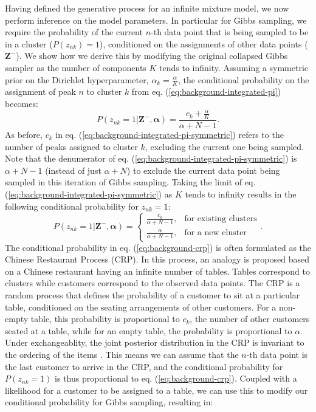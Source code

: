 Having defined the generative process for an infinite mixture model, we now perform inference on the model parameters. In particular for Gibbs sampling, we require the probability of the current $n$-th data point that is being sampled to be in a cluster ($P(z_{nk})=1$), conditioned on the assignments of other data points ($\boldsymbol{Z}^{-}$). We show how we derive this by modifying the original collapsed Gibbs sampler as the number of components $K$ tends to infinity. Assuming a symmetric prior on the Dirichlet hyperparameter, $\alpha_k=\frac{\alpha}{K}$, the conditional probability on the assignment of peak $n$ to cluster $k$ from eq. (\ref{eq:background-integrated-pi}) becomes:
\begin{equation}
P(z_{nk}=1 \vert \boldsymbol{Z}^{-}, \boldsymbol{\alpha}) = \frac{c_k + \frac{\alpha}{K}}{\alpha+N-1}.
\label{eq:background-integrated-pi-symmetric}
\end{equation}
As before, $c_k$ in eq. (\ref{eq:background-integrated-pi-symmetric}) refers to the number of peaks assigned to cluster $k$, excluding the current one being sampled. Note that the denumerator of eq. (\ref{eq:background-integrated-pi-symmetric}) is $\alpha+N-1$ (instead of just $\alpha+N$) to exclude the current data point being sampled in this iteration of Gibbs sampling. Taking the limit of eq. (\ref{eq:background-integrated-pi-symmetric}) as $K$ tends to infinity results in the following conditional probability for $z_{nk}=1$:
\begin{equation}
P(z_{nk}=1 \vert \boldsymbol{Z}^{-}, \boldsymbol{\alpha}) = 
\begin{cases}
    \frac{c_k}{\alpha+N-1}, & \text{for existing clusters} \\
    \frac{\alpha}{\alpha+N-1}, & \text{for a new cluster}
\end{cases}.
\label{eq:background-crp}
\end{equation}
The conditional probability in eq. (\ref{eq:background-crp}) is often formulated as the Chinese Restaurant Process (CRP). In this process, an analogy is proposed based on a Chinese restaurant having an infinite number of tables. Tables correspond to clusters while customers correspond to the observed data points. The CRP is a random process that defines the probability of a customer to sit at a particular table, conditioned on the seating arrangements of other customers. For a non-empty table, this probability is proportional to $c_k$, the number of other customers seated at a table, while for an empty table, the probability is proportional to $\alpha$. Under exchangeablity, the joint posterior distribution in the CRP is invariant to the ordering of the items \cite{aldous1985exchangeability}. This means we can assume that the $n$-th data point is the last customer to arrive in the CRP, and the conditional probability for $P(z_{nk}=1)$ is thus proportional to eq. (\ref{eq:background-crp}). Coupled with a likelihood for a customer to be assigned to a table, we can use this to modify our conditional probability for Gibbs sampling, resulting in:
